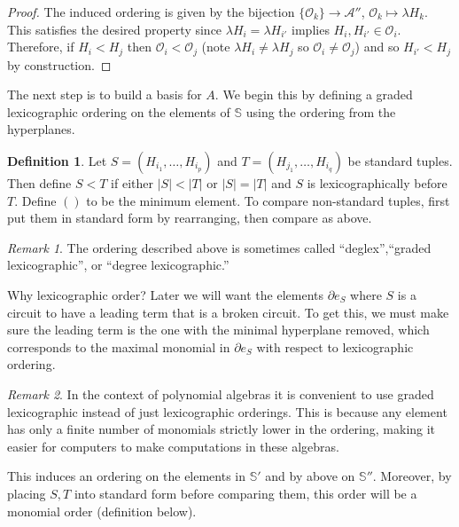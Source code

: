 \documentclass[article,twoside]{article}
\newcommand{\BB}[1]{\mathbb{#1}}
\newcommand{\script}[1]{\mathcal{#1}}
\newcommand{\tuples}{\BB{S}}
\theoremstyle{plain}
\theoremstyle{plain}
\theoremstyle{plain}
\theoremstyle{plain}
\theoremstyle{plain}
\theoremstyle{definition}
\newtheorem{definition}[definition]{Definition}
\theoremstyle{definition}
\theoremstyle{definition}
\theoremstyle{remark}
\theoremstyle{remark}
\newtheorem{remark}[remark]{Remark}
\begin{document}
\begin{proof}
	The induced ordering is given by the bijection $\{\script{O}_k\}\to \script{A}''$, $\script{O}_k\mapsto\lambda H_k$. This satisfies the desired property since $\lambda H_i=\lambda H_{i'}$ implies $H_i,H_{i'}\in \script{O}_i$. Therefore, if $H_i<H_j$ then $\script{O}_i<\script{O}_j$ (note $\lambda H_i\neq \lambda H_j$ so $\script{O}_i\neq\script{O}_j$) and so $H_{i'}<H_j$ by construction.
\end{proof}




The next step is to build a basis for $A$. We begin this by defining a graded lexicographic ordering on the elements of $\tuples$ using the ordering from the hyperplanes.

\begin{definition}
	Let $S=(H_{i_1},\dots,H_{i_p})$ and $T=(H_{j_1},\dots,H_{i_q})$ be standard tuples. Then define $S<T$ if either $|S|<|T|$ or $|S|=|T|$ and $S$ is lexicographically before $T$. Define $()$ to be the minimum element. To compare non-standard tuples, first put them in standard form by rearranging, then compare as above.
\end{definition}

\begin{remark}
	The ordering described above is sometimes called ``deglex'',``graded lexicographic'', or ``degree lexicographic.''
\end{remark}

Why lexicographic order? Later we will want the elements $\partial e_S$ where $S$ is a circuit to have a leading term that is a broken circuit. To get this, we must make sure the leading term is the one with the minimal hyperplane removed, which corresponds to the maximal monomial in $\partial e_S$ with respect to lexicographic ordering.

\begin{remark}
	In the context of polynomial algebras it is convenient to use graded lexicographic instead of just lexicographic orderings. This is because any element has only a finite number of monomials strictly lower in the ordering, making it easier for computers to make computations in these algebras.
\end{remark}

This induces an ordering on the elements in $\tuples'$ and by above on $\tuples''$. Moreover, by placing $S,T$ into standard form before comparing them, this order will be a monomial order (definition below).
\end{document}
